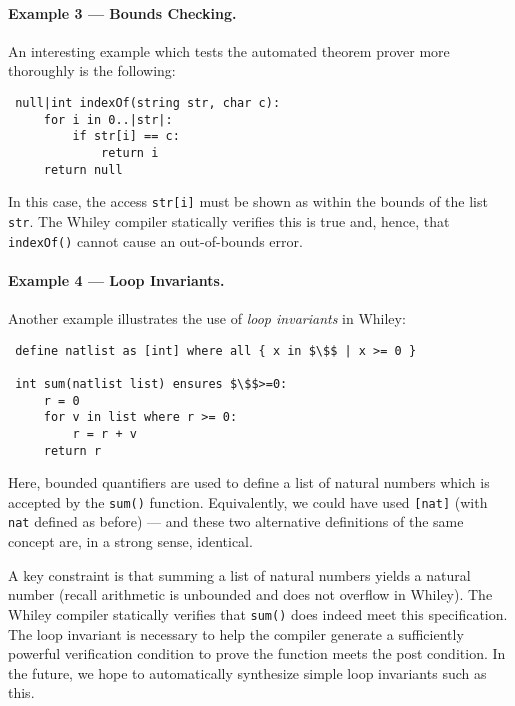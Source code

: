 \paragraph{Example 3 --- Bounds Checking.}
An interesting example which tests the automated theorem prover
more thoroughly is the following:
\begin{lstlisting}
 null|int indexOf(string str, char c):
     for i in 0..|str|:
         if str[i] == c:
             return i
     return null
\end{lstlisting}
In this case, the access \lstinline{str[i]} must be shown as within
the bounds of the list \lstinline{str}.  The Whiley compiler
statically verifies this is true and, hence, that
\lstinline{indexOf()} cannot cause an out-of-bounds error.  
\paragraph{Example 4 --- Loop Invariants.}
Another example illustrates the use of {\em loop invariants} in Whiley:
\begin{lstlisting}
 define natlist as [int] where all { x in $\$$ | x >= 0 }

 int sum(natlist list) ensures $\$$>=0:
     r = 0
     for v in list where r >= 0:
         r = r + v
     return r
\end{lstlisting}
Here, bounded quantifiers are used to define a list of natural numbers
which is accepted by the \lstinline{sum()} function.  Equivalently, we could
have used \lstinline{[nat]} (with \lstinline{nat} defined as before)
--- and these two alternative definitions of the same concept are, in
a strong sense, identical.

A key constraint is that summing a list of natural numbers yields a
natural number (recall arithmetic is unbounded and does not overflow
in Whiley).  The Whiley compiler statically verifies that
\lstinline{sum()} does indeed meet this specification.  The loop
invariant is necessary to help the compiler generate a sufficiently
powerful verification condition to prove the function meets the post
condition.  In the future, we hope to automatically synthesize simple
loop invariants such as this.

